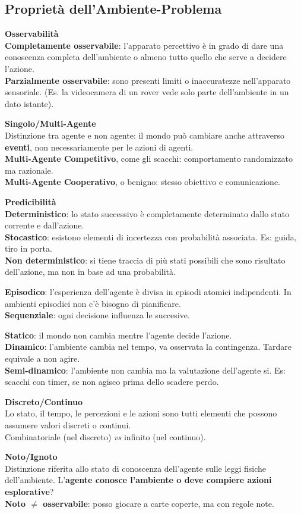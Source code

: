 \documentclass[10pt]{book}
\begin{document}
\subsection{Proprietà dell'Ambiente-Problema}
\begin{list}{-}{}
	\item \textbf{Osservabilità}\\\textbf{Completamente osservabile}: l'apparato percettivo è in grado di dare una conoscenza completa dell'ambiente o almeno tutto quello che serve a decidere l'azione.\\
	\textbf{Parzialmente osservabile}: sono presenti limiti o inaccuratezze nell'apparato sensoriale. (Es. la videocamera di un rover vede solo parte dell'ambiente in un dato istante).
	\item \textbf{Singolo/Multi-Agente}\\
	Distinzione tra agente e non agente: il mondo può cambiare anche attraverso \textbf{eventi}, non necessariamente per le azioni di agenti.\\
	\textbf{Multi-Agente Competitivo}, come gli scacchi: comportamento randomizzato ma razionale.\\
	\textbf{Multi-Agente Cooperativo}, o benigno: stesso obiettivo e comunicazione.
	\item \textbf{Predicibilità}\\
	\textbf{Deterministico}: lo stato successivo è completamente determinato dallo stato corrente e dall'azione.\\
	\textbf{Stocastico}: esistono elementi di incertezza con probabilità associata. Es: guida, tiro in porta.\\
	\textbf{Non deterministico}: si tiene traccia di più stati possibili che sono risultato dell'azione, ma non in base ad una probabilità.
	\item \textbf{Episodico}: l'esperienza dell'agente è divisa in episodi atomici indipendenti. In ambienti episodici non c'è bisogno di pianificare.\\
	\textbf{Sequenziale}: ogni decisione influenza le succesive.
	\pagebreak
	\item \textbf{Statico}: il mondo non cambia mentre l'agente decide l'azione.\\
	\textbf{Dinamico}: l'ambiente cambia nel tempo, va osservata la contingenza. Tardare equivale a non agire.\\
	\textbf{Semi-dinamico}: l'ambiente non cambia ma la valutazione dell'agente si. Es: scacchi con timer, se non agisco prima dello scadere perdo.
	\item \textbf{Discreto/Continuo}\\
	Lo stato, il tempo, le percezioni e le azioni sono tutti elementi che possono assumere valori discreti o continui.\\
	Combinatoriale (nel discreto) \textit{vs} infinito (nel continuo).
	\item \textbf{Noto/Ignoto}\\
	Distinzione riferita allo stato di conoscenza dell'agente sulle leggi fisiche dell'ambiente. L'\textbf{agente conosce l'ambiente o deve compiere azioni esplorative}?\\
	\textbf{Noto $\neq$ osservabile}: posso giocare a carte coperte, ma con regole note.
\end{list}
\end{document}
